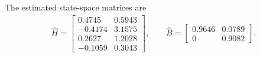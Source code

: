 \documentclass[12pt]{article}
\begin{document}
\begin{enumerate}[label=\arabic*.]
The estimated state-space matrices are
\begin{align*}
    \hat{H} = \begin{bmatrix}
        0.4745 & 0.5943\\
        -0.4174 & 3.1575\\
        0.2627 & 1.2028\\
        -0.1059 & 0.3043
    \end{bmatrix}, \qquad
    \hat{B} = \begin{bmatrix}
        0.9646 & 0.0789\\
        0 & 0.9082
    \end{bmatrix}.
\end{align*}



\end{enumerate}
\end{document}
